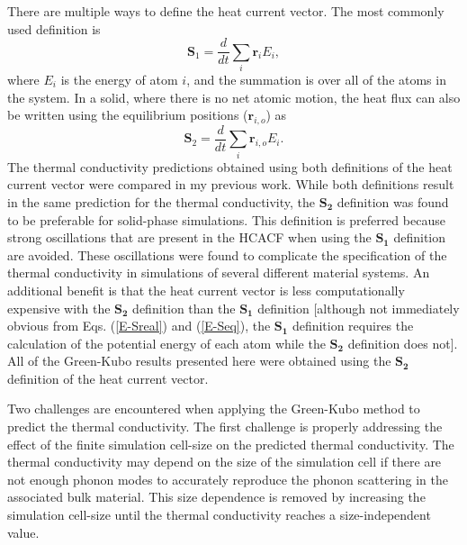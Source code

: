 \documentclass[letterpaper,12pt]{article}
\newcommand{\f}[2]{\ensuremath{\frac{\displaystyle{#1}}{\displaystyle{#2}}}}
\begin{document}
There are multiple ways to define the heat current
vector.\cite{mcgaughey2006book,ladd1986,julithesis} The most
commonly used definition is
\begin{equation}
\mathbf{S}_1 = \f{d}{dt} \sum_i \mathbf{r}_i E_i, \label{E-Sreal}
\end{equation}
where $E_i$ is the energy of atom $i$, and the summation is over all
of the atoms in the system. In a solid, where there is no net atomic
motion, the heat flux can also be written using the equilibrium
positions ($\mathbf{r}_{i,o}$) as
\begin{equation}
\mathbf{S}_2 = \f{d}{dt} \sum_i \mathbf{r}_{i,o} E_i. \label{E-Seq}
\end{equation}
The thermal conductivity predictions obtained using both definitions
of the heat current vector were compared in my previous
work.\cite{landry2008a} While both definitions result in the same
prediction for the thermal conductivity, the $\mathbf{S_2}$
definition was found to be preferable for solid-phase simulations.
This definition is preferred because strong oscillations that are
present in the HCACF when using the $\mathbf{S_1}$ definition are
avoided. These oscillations were found to complicate the
specification of the thermal conductivity in simulations of several
different material
systems.\cite{che2000,landry2008a,mcgaughey2006,mcgaughey2004b} An
additional benefit is that the heat current vector is less
computationally expensive with the $\mathbf{S_2}$ definition than
the $\mathbf{S_1}$ definition [although not immediately obvious from
Eqs. (\ref{E-Sreal}) and (\ref{E-Seq}), the $\mathbf{S_1}$
definition requires the calculation of the potential energy of each
atom while the $\mathbf{S_2}$ definition does
not\cite{landry2008a}]. All of the Green-Kubo results presented here
were obtained using the $\mathbf{S_2}$ definition of the heat
current vector.


Two challenges are encountered when applying the Green-Kubo method
to predict the thermal conductivity. The first challenge is properly
addressing the effect of the finite simulation cell-size on the
predicted thermal conductivity. The thermal conductivity may depend
on the size of the simulation cell if there are not enough phonon
modes to accurately reproduce the phonon scattering in the
associated bulk material. This size dependence is removed by
increasing the simulation cell-size until the thermal conductivity
reaches a size-independent value.
\end{document}
